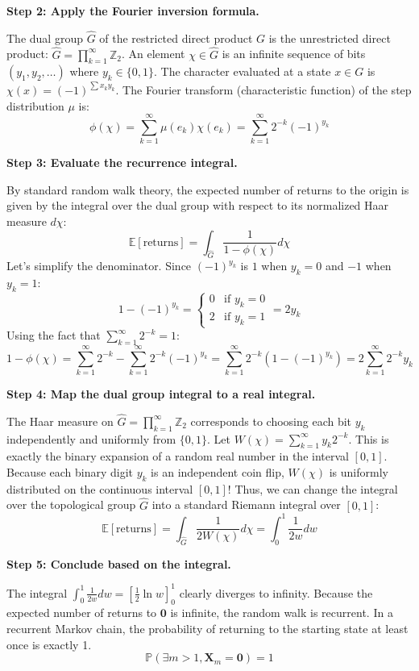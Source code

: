 \begin{solution}
\textbf{Step 2: Apply the Fourier inversion formula.}

The dual group $\hat{G}$ of the restricted direct product $G$ is the unrestricted direct product: $\hat{G} = \prod_{k=1}^\infty \mathbb{Z}_2$.
An element $\chi \in \hat{G}$ is an infinite sequence of bits $(y_1, y_2, \dots)$ where $y_k \in \{0, 1\}$.
The character evaluated at a state $x \in G$ is $\chi(x) = (-1)^{\sum x_k y_k}$.
The Fourier transform (characteristic function) of the step distribution $\mu$ is:
\[ \phi(\chi) = \sum_{k=1}^\infty \mu(e_k) \chi(e_k) = \sum_{k=1}^\infty 2^{-k} (-1)^{y_k} \]

\textbf{Step 3: Evaluate the recurrence integral.}

By standard random walk theory, the expected number of returns to the origin is given by the integral over the dual group with respect to its normalized Haar measure $d\chi$:
\[ \mathbb{E}[\text{returns}] = \int_{\hat{G}} \frac{1}{1 - \phi(\chi)} d\chi \]
Let's simplify the denominator. Since $(-1)^{y_k}$ is $1$ when $y_k=0$ and $-1$ when $y_k=1$:
\[ 1 - (-1)^{y_k} = \begin{cases} 0 & \text{if } y_k = 0 \\ 2 & \text{if } y_k = 1 \end{cases} = 2y_k \]
Using the fact that $\sum_{k=1}^\infty 2^{-k} = 1$:
\[ 1 - \phi(\chi) = \sum_{k=1}^\infty 2^{-k} - \sum_{k=1}^\infty 2^{-k} (-1)^{y_k} = \sum_{k=1}^\infty 2^{-k} (1 - (-1)^{y_k}) = 2 \sum_{k=1}^\infty 2^{-k} y_k \]

\textbf{Step 4: Map the dual group integral to a real integral.}

The Haar measure on $\hat{G} = \prod_{k=1}^\infty \mathbb{Z}_2$ corresponds to choosing each bit $y_k$ independently and uniformly from $\{0, 1\}$.
Let $W(\chi) = \sum_{k=1}^\infty y_k 2^{-k}$.
This is exactly the binary expansion of a random real number in the interval $[0, 1]$. Because each binary digit $y_k$ is an independent coin flip, $W(\chi)$ is uniformly distributed on the continuous interval $[0, 1]$!
Thus, we can change the integral over the topological group $\hat{G}$ into a standard Riemann integral over $[0, 1]$:
\[ \mathbb{E}[\text{returns}] = \int_{\hat{G}} \frac{1}{2 W(\chi)} d\chi = \int_0^1 \frac{1}{2w} dw \]

\textbf{Step 5: Conclude based on the integral.}

The integral $\int_0^1 \frac{1}{2w} dw = \left[ \frac{1}{2} \ln w \right]_0^1$ clearly diverges to infinity.
Because the expected number of returns to $\mathbf{0}$ is infinite, the random walk is recurrent.
In a recurrent Markov chain, the probability of returning to the starting state at least once is exactly 1.
\[ \mathbb{P}(\exists m > 1, \mathbf{X}_m = \mathbf{0}) = 1 \]
\end{solution}

